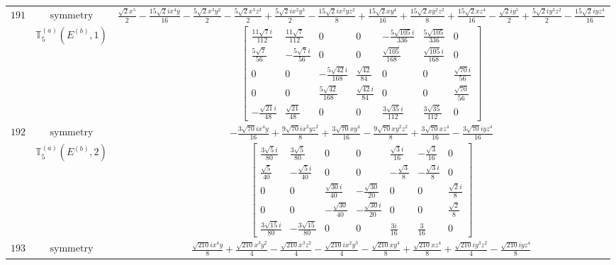 \documentclass[fleqn,8pt,landscape]{jsarticle}
\begin{document}
\begin{longtable}{ccc}
$ 191 $ & $ \text{symmetry} $ & $ \frac{\sqrt{2} x^{5}}{2} - \frac{15 \sqrt{2} i x^{4} y}{16} - \frac{5 \sqrt{2} x^{3} y^{2}}{2} - \frac{5 \sqrt{2} x^{3} z^{2}}{2} + \frac{5 \sqrt{2} i x^{2} y^{3}}{2} - \frac{15 \sqrt{2} i x^{2} y z^{2}}{8} + \frac{15 \sqrt{2} x y^{4}}{16} + \frac{15 \sqrt{2} x y^{2} z^{2}}{8} + \frac{15 \sqrt{2} x z^{4}}{16} - \frac{\sqrt{2} i y^{5}}{2} + \frac{5 \sqrt{2} i y^{3} z^{2}}{2} - \frac{15 \sqrt{2} i y z^{4}}{16} $ \\
$  $ & $ \mathbb{T}_{5}^{(a)}(E^{(b)},1) $ & $ \begin{bmatrix} \frac{11 \sqrt{7} i}{112} & \frac{11 \sqrt{7}}{112} & 0 & 0 & - \frac{5 \sqrt{105} i}{336} & \frac{5 \sqrt{105}}{336} & 0 \\ \frac{5 \sqrt{7}}{56} & - \frac{5 \sqrt{7} i}{56} & 0 & 0 & \frac{\sqrt{105}}{168} & \frac{\sqrt{105} i}{168} & 0 \\ 0 & 0 & - \frac{5 \sqrt{42} i}{168} & \frac{\sqrt{42}}{84} & 0 & 0 & \frac{\sqrt{70} i}{56} \\ 0 & 0 & \frac{5 \sqrt{42}}{168} & \frac{\sqrt{42} i}{84} & 0 & 0 & \frac{\sqrt{70}}{56} \\ - \frac{\sqrt{21} i}{48} & \frac{\sqrt{21}}{48} & 0 & 0 & \frac{3 \sqrt{35} i}{112} & \frac{3 \sqrt{35}}{112} & 0 \end{bmatrix} $ \\ \hline
$ 192 $ & $ \text{symmetry} $ & $ - \frac{3 \sqrt{70} i x^{4} y}{16} + \frac{9 \sqrt{70} i x^{2} y z^{2}}{8} + \frac{3 \sqrt{70} x y^{4}}{16} - \frac{9 \sqrt{70} x y^{2} z^{2}}{8} + \frac{3 \sqrt{70} x z^{4}}{16} - \frac{3 \sqrt{70} i y z^{4}}{16} $ \\
$  $ & $ \mathbb{T}_{5}^{(a)}(E^{(b)},2) $ & $ \begin{bmatrix} \frac{3 \sqrt{5} i}{80} & \frac{3 \sqrt{5}}{80} & 0 & 0 & \frac{\sqrt{3} i}{16} & - \frac{\sqrt{3}}{16} & 0 \\ \frac{\sqrt{5}}{40} & - \frac{\sqrt{5} i}{40} & 0 & 0 & - \frac{\sqrt{3}}{8} & - \frac{\sqrt{3} i}{8} & 0 \\ 0 & 0 & \frac{\sqrt{30} i}{40} & - \frac{\sqrt{30}}{20} & 0 & 0 & \frac{\sqrt{2} i}{8} \\ 0 & 0 & - \frac{\sqrt{30}}{40} & - \frac{\sqrt{30} i}{20} & 0 & 0 & \frac{\sqrt{2}}{8} \\ \frac{3 \sqrt{15} i}{80} & - \frac{3 \sqrt{15}}{80} & 0 & 0 & \frac{3 i}{16} & \frac{3}{16} & 0 \end{bmatrix} $ \\ \hline
$ 193 $ & $ \text{symmetry} $ & $ \frac{\sqrt{210} i x^{4} y}{8} + \frac{\sqrt{210} x^{3} y^{2}}{4} - \frac{\sqrt{210} x^{3} z^{2}}{4} - \frac{\sqrt{210} i x^{2} y^{3}}{4} - \frac{\sqrt{210} x y^{4}}{8} + \frac{\sqrt{210} x z^{4}}{8} + \frac{\sqrt{210} i y^{3} z^{2}}{4} - \frac{\sqrt{210} i y z^{4}}{8} $ \\

\end{longtable}
\end{document}

